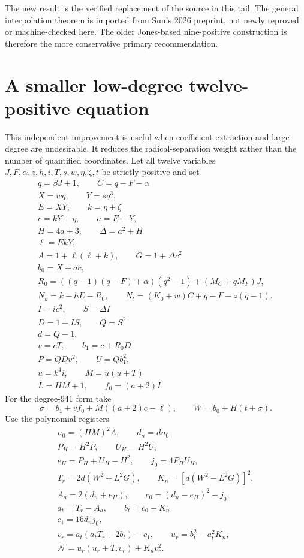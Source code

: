 \documentclass[11pt]{article}
\begin{document}
The new result is the verified replacement of the source in this tail.
The general interpolation theorem is imported from Sun's 2026 preprint,
not newly reproved or machine-checked here. The older Jones-based nine-positive
construction is therefore the more conservative primary recommendation.

\section{A smaller low-degree twelve-positive equation}
This independent improvement is useful when coefficient extraction and
large degree are undesirable. It reduces the radical-separation weight rather
than the number of quantified coordinates. Let all twelve variables
$J,F,\alpha,z,h,i,T,s,w,\eta,\zeta,t$ be strictly positive and set
\[\begin{gathered}
q=\beta J+1,\qquad C=q-F-\alpha\\
X=wq,\qquad Y=sq^3,\\
E=XY,\qquad k=\eta+\zeta\\
c=kY+\eta,\qquad a=E+Y,\\
H=4a+3,\qquad \Delta=a^2+H\\
\ell=EkY,\\
A=1+\ell(\ell+k),\qquad G=1+\Delta c^2\\
b_0=X+ac,\\
R_0=((q-1)(q-F)+\alpha)(q^2-1)+(M_C+qM_F)J,\\
N_k=k-hE-R_0,\qquad N_t=(K_0+w)C+q-F-z(q-1),\\
I=ic^2,\qquad S=\Delta I\\
D=1+IS,\qquad Q=S^2\\
d=Q-1,\\
v=cT,\qquad b_1=c+R_0D\\
P=QDv^2,\qquad U=Qb_1^2,\\
u=k^4i,\qquad M=u(u+T)\\
L=HM+1,\qquad f_0=(a+2)I.
\end{gathered}\]
For the degree-941 form take
\[
 \sigma=b_1+vf_0+M((a+2)c-\ell),\qquad W=b_0+H(t+\sigma).
\]
Use the polynomial registers
\[\begin{gathered}
n_0=(HM)^2A,\qquad d_n=dn_0\\
P_H=H^2P,\qquad U_H=H^2U,\\
e_H=P_H+U_H-H^2,\qquad j_0=4P_HU_H,\\
T_r=2d(W^2+L^2G),\qquad K_n=[d(W^2-L^2G)]^2,\\
A_a=2(d_n+e_H),\qquad c_0=(d_n-e_H)^2-j_0,\\
a_t=T_r-A_a,\qquad b_t=c_0-K_n\\
c_1=16d_nj_0,\\
v_r=a_t(a_tT_r+2b_t)-c_1,\qquad u_r=b_t^2-a_t^2K_n,\\
\mathcal N=u_r(u_r+T_rv_r)+K_nv_r^2.
\end{gathered}\]
\end{document}
